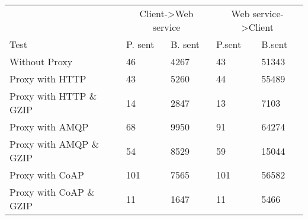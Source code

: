 \begin{tabularx}{\textwidth}{lXXXX}
\hline
\multicolumn{1}{l}{}                  & \multicolumn{2}{c}{Client->Web service}                           & \multicolumn{2}{c}{Web service->Client}                           \\
\multicolumn{1}{l}{Test} & \multicolumn{1}{l}{P. sent} & \multicolumn{1}{l}{B. sent} & \multicolumn{1}{l}{P.sent} & \multicolumn{1}{l}{B.sent} \\ \hline
Without Proxy                   & 46             & 4267           & 43             & 51343          \\
Proxy with HTTP                 & 43             & 5260           & 44             & 55489          \\
Proxy with HTTP \& GZIP         & 14             & 2847           & 13             & 7103           \\
Proxy with AMQP                 & 68             & 9950           & 91             & 64274          \\
Proxy with AMQP \& GZIP         & 54             & 8529           & 59             & 15044          \\
Proxy with CoAP                 & 101            & 7565           & 101            & 56582          \\
Proxy with CoAP \& GZIP         & 11             & 1647           & 11             & 5466           \\
\end{tabularx}
